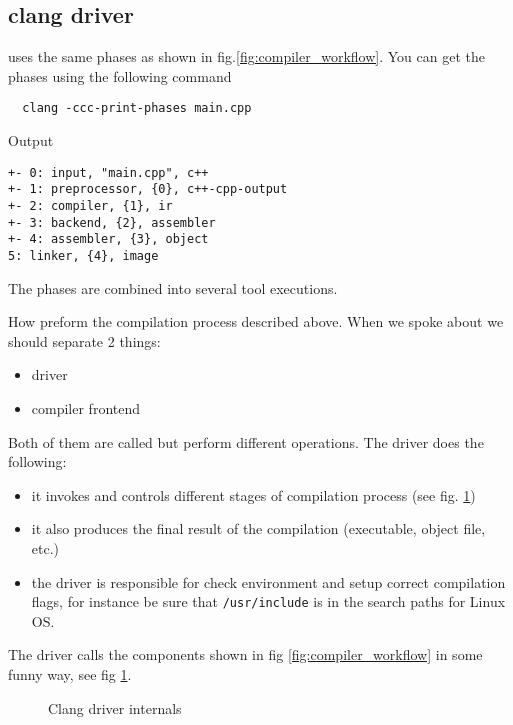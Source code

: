 \subsection{clang driver}
\clang uses the same phases as shown in fig.\ref{fig:compiler_workflow}. You can
get the phases using the following command 
\begin{verbatim}
  clang -ccc-print-phases main.cpp
\end{verbatim}

Output
\begin{verbatim}
+- 0: input, "main.cpp", c++
+- 1: preprocessor, {0}, c++-cpp-output
+- 2: compiler, {1}, ir
+- 3: backend, {2}, assembler
+- 4: assembler, {3}, object
5: linker, {4}, image
\end{verbatim}

The phases are combined into several tool executions. 


How \clang preform the compilation process described above. When we spoke about
\clang we should separate 2 things: 
\begin{itemize}
\item driver
\item compiler frontend 
\end{itemize}
Both of them are called \clang but perform different
operations. The driver does the following:
\begin{itemize}
  \item it invokes and controls different stages of compilation process (see
    fig. \ref{fig:clang_driver})
  \item it also produces the final result of the compilation (executable,
      object file, etc.)
  \item the driver is responsible for check environment and setup correct
      compilation flags, for instance be sure that
      \texttt{/usr/include} is in the search paths for Linux OS.    
\end{itemize}

The \clang driver calls the components shown in fig \ref{fig:compiler_workflow}
in some funny way, see fig \ref{fig:clang_driver}.
\begin{figure}
  \begin{center}
  \end{center}
  \caption{Clang driver internals}
  \label{fig:clang_driver}
\end{figure}

